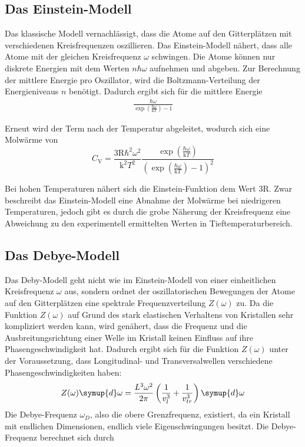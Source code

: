 \subsection{Das Einstein-Modell}
Das klassische Modell vernachlässigt, dass die Atome auf den Gitterplätzen
mit verschiedenen Kreisfrequenzen oszillieren. Das Einstein-Modell nähert,
dass alle Atome mit der gleichen Kreisfrequenz $\omega$ schwingen. Die Atome
können nur diskrete Energien mit dem Werten $n \hbar \omega$ aufnehmen und
abgeben. Zur Berechnung der mittlere Energie pro Oszillator, wird die
Boltzmann-Verteilung der Energieniveaus $n$ benötigt. Dadurch ergibt sich
für die mittlere Energie
\begin{align*}
  \frac{\hbar \omega}{\exp\left(\frac{\hbar \omega}{\text{k} T} \right) -1}
\end{align*}

Erneut wird der Term nach der Temperatur abgeleitet, wodurch sich eine Molwärme
von
\begin{equation}
  C_{\text{V}} = \frac{3 \text{R} \hbar^2 \omega^2}{\text{k}^2 T^2}
  \frac{\exp\left(\frac{\hbar \omega}{\text{k} T}\right)}{\left(\exp\left(\frac{\hbar \omega}{\text{k} T}\right) -1 \right)^2}
\end{equation}

Bei hohen Temperaturen nähert sich die Einstein-Funktion dem Wert $3 \text{R}$.
Zwar beschreibt das Einstein-Modell eine Abnahme der Molwärme bei niedrigeren
Temperaturen, jedoch gibt es durch die grobe Näherung der Kreisfrequenz eine
Abweichung zu den experimentell ermittelten Werten in Tieftemperaturbereich.

\subsection{Das Debye-Modell}
Das Deby-Modell geht nicht wie im Einstein-Modell von einer einheitlichen
Kreisfrequenz $\omega$ aus, sondern ordnet der oszillatorischen Bewegungen
der Atome auf den Gitterplätzen eine spektrale Frequenzverteilung $Z(\omega)$
zu. Da die Funktion $Z(\omega)$ auf Grund des stark elastischen Verhaltens
von Kristallen sehr kompliziert werden kann, wird genähert, dass die Frequenz
und die Ausbreitungsrichtung einer Welle im Kristall keinen Einfluss auf
ihre Phasengeschwindigkeit hat. Dadurch ergibt sich für die Funktion $Z(\omega)$
unter der Voraussetzung, dass Longitudinal- und Transversalwellen verschiedene
Phasengeschwindigkeiten haben:
\begin{equation*}
  Z(\omega) \symup{d} \omega = \frac{L^3 \omega^2}{2 \pi}
  \left(\frac{1}{v_l^3} + \frac{1}{v_{tr}^3} \right) \symup{d}\omega
  \label{eqn:Z}
\end{equation*}
Die Debye-Frequenz $\omega_D$, also die obere Grenzfrequenz, existiert, da ein
Kristall mit endlichen Dimensionen, endlich viele Eigenschwingungen besitzt.
Die Debye-Frequenz
berechnet sich durch

